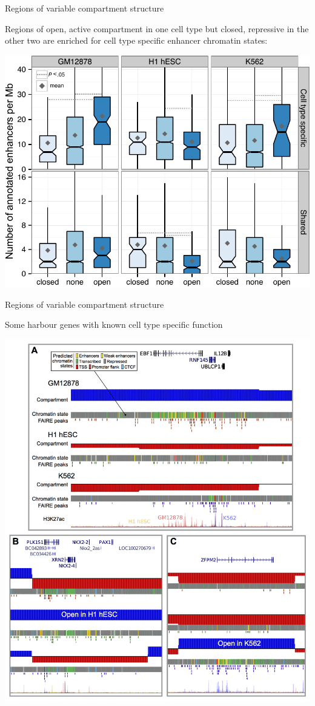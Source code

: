 \documentclass{beamer}
\begin{document}
\begin{frame}{Regions of variable compartment structure}

Regions of open, active compartment in one cell type but closed, repressive in the other two are enriched for cell type specific enhancer chromatin states: \\

\vspace{2em}

\centering
\includegraphics[width=.55\textwidth]{../figs/enhancerstates.pdf}

\end{frame}

\begin{frame}{Regions of variable compartment structure}

Some harbour genes with known cell type specific function

\vspace{1em}

\centering
\includegraphics[width=.55\textwidth]{../figs/examplervs.png}

\end{frame}
\end{document}
